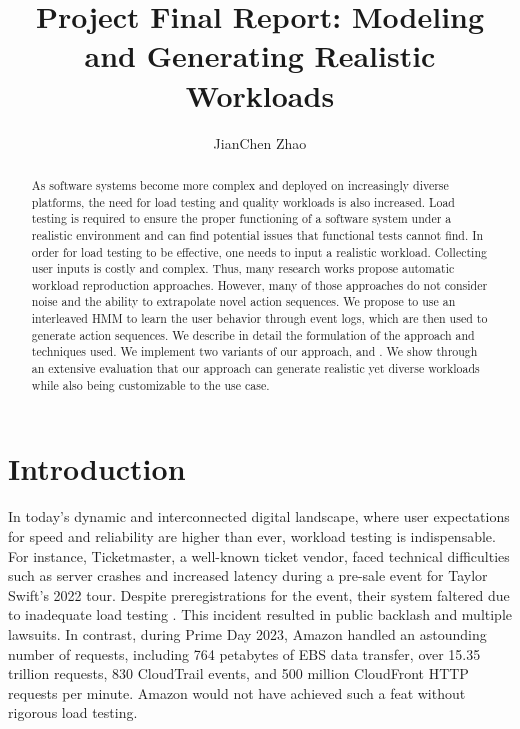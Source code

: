 

\title{Project Final Report: Modeling and Generating Realistic Workloads}
\author{JianChen Zhao}




\begin{abstract}
    As software systems become more complex and deployed on increasingly diverse platforms, the need for load testing and quality workloads is also increased. Load testing is required to ensure the proper functioning of a software system under a realistic environment and can find potential issues that functional tests cannot find. In order for load testing to be effective, one needs to input a realistic workload. Collecting user inputs is costly and complex. Thus, many research works propose automatic workload reproduction approaches. However, many of those approaches do not consider noise and the ability to extrapolate novel action sequences. We propose to use an interleaved HMM to learn the user behavior through event logs, which are then used to generate action sequences. We describe in detail the formulation of the approach and techniques used. We implement two variants of our approach, \worklogalpha{} and \worklogbeta{}. We show through an extensive evaluation that our approach can generate realistic yet diverse workloads while also being customizable to the use case.
\end{abstract}

\maketitle

\section{Introduction}

In today's dynamic and interconnected digital landscape, where user expectations for speed and reliability are higher than ever, workload testing is indispensable. For instance, Ticketmaster, a well-known ticket vendor, faced technical difficulties such as server crashes and increased latency during a pre-sale event for Taylor Swift's 2022 tour. Despite preregistrations for the event, their system faltered due to inadequate load testing \cite{Reuters2022-dc}. This incident resulted in public backlash and multiple lawsuits. In contrast, during Prime Day 2023, Amazon handled an astounding number of requests, including 764 petabytes of EBS data transfer, over 15.35 trillion requests, 830 CloudTrail events, and 500 million CloudFront HTTP requests per minute. Amazon would not have achieved such a feat without rigorous load testing\cite{Barr2023-wr}.

